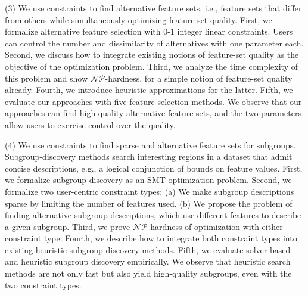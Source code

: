 (3) We use constraints to find alternative feature sets, i.e., feature sets that differ from others while simultaneously optimizing feature-set quality.
First, we formalize alternative feature selection with 0-1 integer linear constraints.
Users can control the number and dissimilarity of alternatives with one parameter each.
Second, we discuss how to integrate existing notions of feature-set quality as the objective of the optimization problem.
Third, we analyze the time complexity of this problem and show $\mathcal{NP}$-hardness, for a simple notion of feature-set quality already.
Fourth, we introduce heuristic approximations for the latter.
Fifth, we evaluate our approaches with five feature-selection methods.
We observe that our approaches can find high-quality alternative feature sets, and the two parameters allow users to exercise control over the quality.

(4) We use constraints to find sparse and alternative feature sets for subgroups.
Subgroup-discovery methods search interesting regions in a dataset that admit concise descriptions, e.g., a logical conjunction of bounds on feature values.
First, we formalize subgroup discovery as an SMT optimization problem.
Second, we formalize two user-centric constraint types:
(a) We make subgroup descriptions sparse by limiting the number of features used.
(b) We propose the problem of finding alternative subgroup descriptions, which use different features to describe a given subgroup.
Third, we prove $\mathcal{NP}$-hardness of optimization with either constraint type.
Fourth, we describe how to integrate both constraint types into existing heuristic subgroup-discovery methods.
Fifth, we evaluate solver-based and heuristic subgroup discovery empirically.
We observe that heuristic search methods are not only fast but also yield high-quality subgroups, even with the two constraint types.
